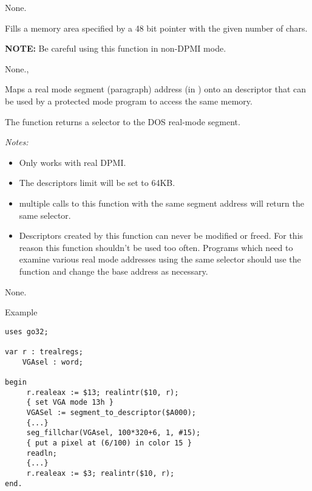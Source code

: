 
{None.}{}

{Fills a memory area specified by a 48 bit pointer with the given number
of chars.

\textbf {NOTE:} Be careful using this function in non-DPMI mode. 
}{None.}{, }


{ Maps a real mode segment (paragraph) address 
(in ) onto an descriptor that can be used by a protected mode 
program to access  the same memory.

The function returns a selector to the DOS real-mode segment.

{\em Notes:}
\begin{itemize}
\item Only works with real DPMI.
\item The descriptors limit will be set to 64KB.
\item multiple calls to this function with the same segment address will
  return the same selector.
\item Descriptors created by this function can never be modified or freed.
For this reason this function shouldn't be used too often. Programs
which need to examine various real mode addresses using the same
selector should use the function  and change
the base address as necessary.
\end{itemize}
}
{None.}
{}
\begin{FPCList}
\item[Example]
\begin{verbatim}
uses go32;

var r : trealregs;
    VGAsel : word;

begin
     r.realeax := $13; realintr($10, r); 
     { set VGA mode 13h }
     VGASel := segment_to_descriptor($A000);
     {...}
     seg_fillchar(VGAsel, 100*320+6, 1, #15); 
     { put a pixel at (6/100) in color 15 }
     readln;
     {...} 
     r.realeax := $3; realintr($10, r);
end.
\end{verbatim}
\end{FPCList}

